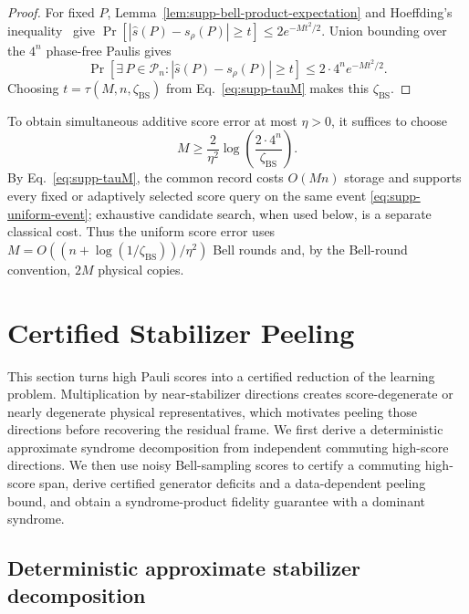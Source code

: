 \documentclass[
  aps,
  prx,
  reprint,
  superscriptaddress,
  amsmath,
  amssymb,
  nofootinbib,
  longbibliography
]{revtex4-2}
\newcommand{\Pc}{\mathcal{P}}
\begin{document}
\begin{proof}
For fixed $P$, Lemma~\ref{lem:supp-bell-product-expectation} and Hoeffding's
inequality~\cite{Hoeffding1963} give
$\Pr[|\hat s(P)-s_\rho(P)|\ge t]\le2e^{-Mt^2/2}$.  Union bounding over the
$4^n$ phase-free Paulis gives
\begin{equation}
\Pr\!\left[
\exists\,P\in\Pc_n:
|\hat s(P)-s_\rho(P)|\ge t
\right]
\le2\cdot4^n e^{-Mt^2/2}.
\end{equation}
Choosing $t=\tau(M,n,\zeta_{\mathrm{BS}})$ from
Eq.~\eqref{eq:supp-tauM} makes this $\zeta_{\mathrm{BS}}$.
\end{proof}

To obtain simultaneous additive score error at most $\eta>0$, it suffices
to choose
\begin{equation}
M
\ge
\frac{2}{\eta^2}
\log\!\left(\frac{2\cdot4^n}{\zeta_{\mathrm{BS}}}\right).
\end{equation}
By Eq.~\eqref{eq:supp-tauM}, the common record costs $O(Mn)$ storage and
supports every fixed or adaptively selected score query on the same event
\eqref{eq:supp-uniform-event}; exhaustive candidate search, when used below,
is a separate classical cost.  Thus the uniform score error uses
$M=O((n+\log(1/\zeta_{\mathrm{BS}}))/\eta^2)$ Bell rounds and, by the
Bell-round convention, $2M$ physical copies.



\section{Certified Stabilizer Peeling}
\label{sec:supp-stabilizer-peeling}

This section turns high Pauli scores into a certified reduction of the
learning problem.  Multiplication by near-stabilizer directions creates
score-degenerate or nearly degenerate physical representatives, which
motivates peeling those directions before recovering the residual frame.  We
first derive a deterministic approximate syndrome decomposition from
independent commuting high-score directions.  We then use noisy Bell-sampling
scores to certify a commuting high-score span, derive certified generator
deficits and a data-dependent peeling bound, and obtain a syndrome-product
fidelity guarantee with a dominant syndrome.

\subsection{Deterministic approximate stabilizer decomposition}
\label{sec:supp-deterministic-approximate-stabilizer-decomposition}
\end{document}
